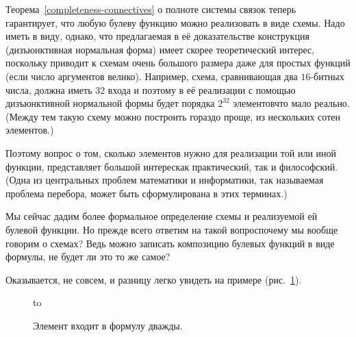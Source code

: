 Теорема~\ref{completeness-connectives} о полноте
системы связок%
теперь гарантирует, что любую булеву
функцию можно реализовать в виде схемы. Надо иметь в
виду, однако, что предлагаемая в её доказательстве
конструкция (дизъюнктивная нормальная форма)%
имеет
скорее теоретический интерес, поскольку приводит к
схемам очень большого размера даже для простых
функций (если число аргументов велико). Например,
схема, сравнивающая два $16$-битных числа, должна
иметь $32$ входа и поэтому в её реализации с помощью
дизъюнктивной нормальной формы будет порядка $2^{32}$
элементов\т что мало реально. (Между тем такую схему
можно построить гораздо проще, из нескольких сотен
элементов.)

Поэтому вопрос о том, сколько элементов нужно для
реализации той или иной функции, представляет большой
интерес\т как практический, так и философский.
(Одна из центральных проблем математики и информатики,
так называемая  проблема перебора,%
может быть
сформулирована в этих терминах.)

Мы сейчас дадим более формальное определение схемы и
реализуемой ей булевой функции. Но прежде всего
ответим на такой вопрос\т почему мы вообще говорим
о схемах? Ведь можно записать композицию булевых
функций в виде формулы, не будет ли это то же
самое?

Оказывается, не совсем, и разницу легко увидеть на
примере (рис.~\ref{scheme-2}).

\begin{figure}[h]
\hbox to 
\caption{Элемент входит в формулу дважды.}
\label{scheme-2}
\end{figure}

